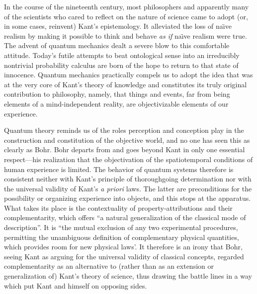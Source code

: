 \documentclass[smallextended]{svjour3}
\begin{document}
In the course of the nineteenth century, most philosophers and apparently many of the scientists who cared to reflect on the nature of science came to  adopt (or, in some cases, reinvent) Kant's epistemology. It alleviated the loss of na\"\i ve realism by making it possible to think and behave \emph{as if} na\"\i ve realism were true. The advent of quantum mechanics dealt a severe blow to this comfortable attitude. Today's futile attempts to beat ontological sense into an irreducibly nontrivial probability calculus are born of the hope to return to that state of innocence. Quantum mechanics practically compels us to adopt the idea that was at the very core of Kant's theory of knowledge and constitutes its truly original contribution to philosophy, namely, that things and events, far from being elements of a mind-independent reality, are objectivizable elements of our experience.

Quantum theory reminds us of the roles perception and conception play in the construction and constitution of the objective world, and no one has seen this as clearly as Bohr. Bohr departs from and goes beyond Kant in only one essential respect---his realization that the {objectivation} of the spatiotemporal conditions of human experience is limited. The behavior of quantum systems therefore is consistent neither with Kant's principle of thoroughgoing determination nor with the universal validity of Kant's \emph{a priori} laws. The latter are preconditions for the possibility or organizing experience into objects, and this stops at the apparatus. What takes its place is the contextuality of property-attributions and their complementarity, which offers ``a natural generalization of the classical mode of description''.\cite{BohrQPRDAP} It is ``the mutual exclusion of any two experimental procedures, permitting the unambiguous definition of complementary physical quantities, which provides room for new physical laws'.\cite{Bohr-APHKb} It therefore is an irony that Bohr, seeing Kant as arguing for the universal validity of {classical concepts}, regarded {complementarity} as an alternative to (rather than as an extension or generalization of) Kant's theory of science, thus drawing the battle lines in a way which put {Kant} and himself on opposing sides.
\end{document}
